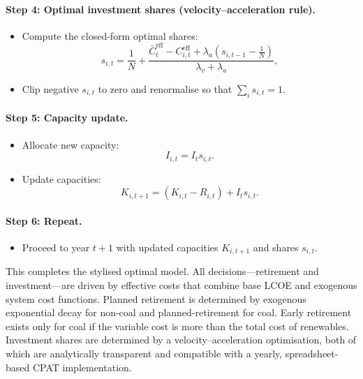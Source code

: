 \documentclass[preprint,authoryear,12pt]{elsarticle}
\begin{document}
\noindent
\paragraph{Step 4: Optimal investment shares (velocity–acceleration rule).}
\begin{itemize}
    \item Compute the closed-form optimal shares:
    \[
        s_{i,t}
        = \frac{1}{N}
          + \frac{
                \bar{C}_t^{\mathrm{eff}}
              - C_{i,t}^{\mathrm{eff}}
              + \lambda_a (s_{i,t-1} - \tfrac{1}{N})
            }{\lambda_v + \lambda_a},
    \]
    \item Clip negative $s_{i,t}$ to zero and renormalise so that $\sum_i s_{i,t} = 1$.
\end{itemize}

\noindent
\paragraph{Step 5: Capacity update.}
\begin{itemize}
    \item Allocate new capacity:
    \[
        I_{i,t} = I_t s_{i,t}.
    \]
    \item Update capacities:
    \[
        K_{i,t+1}
        = (K_{i,t} - R_{i,t}) + I_t s_{i,t}.
    \]
\end{itemize}

\noindent
\paragraph{Step 6: Repeat.}
\begin{itemize}
    \item Proceed to year $t+1$ with updated capacities $K_{i,t+1}$ and shares $s_{i,t}$.
\end{itemize}

\medskip

This completes the stylised optimal model. All decisions—retirement and investment—are driven
by effective costs that combine base LCOE and exogenous system cost functions. Planned retirement is
determined by exogenous exponential decay for non-coal and planned-retirement for coal. Early retirement exists only for coal if the variable cost is more than the total cost of renewables. Investment shares are determined by a velocity–acceleration optimisation, both of which are analytically transparent and compatible
with a yearly, spreadsheet-based CPAT implementation.
\end{document}
